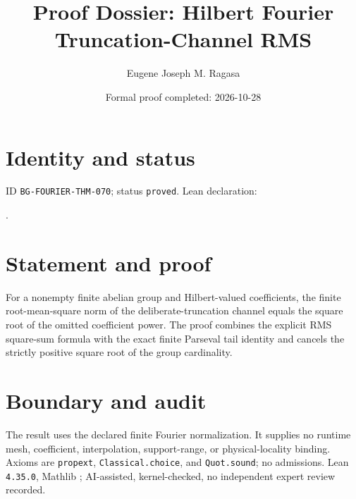 \documentclass[11pt]{article}
\title{Proof Dossier: Hilbert Fourier Truncation-Channel RMS}\author{Eugene Joseph M. Ragasa}\date{Formal proof completed: 2026-10-28}
\begin{document}
\raggedright\maketitle
\section{Identity and status}
ID \texttt{BG-FOURIER-THM-070}; status \texttt{proved}. Lean declaration:
\par{}.
\section{Statement and proof}
For a nonempty finite abelian group and Hilbert-valued coefficients, the finite root-mean-square norm of the deliberate-truncation channel equals the square root of the omitted coefficient power. The proof combines the explicit RMS square-sum formula with the exact finite Parseval tail identity and cancels the strictly positive square root of the group cardinality.
\section{Boundary and audit}
The result uses the declared finite Fourier normalization. It supplies no runtime mesh, coefficient, interpolation, support-range, or physical-locality binding. Axioms are \texttt{propext}, \texttt{Classical.choice}, and \texttt{Quot.sound}; no admissions. Lean \texttt{4.35.0}, Mathlib {\scriptsize{}}; AI-assisted, kernel-checked, no independent expert review recorded.
\end{document}
